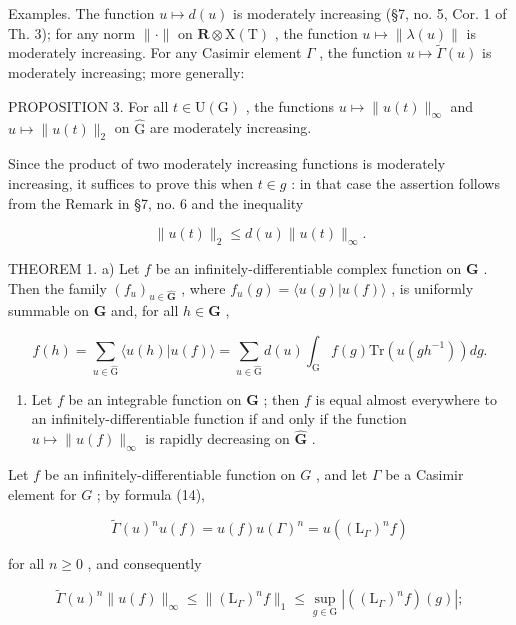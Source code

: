 Examples. The function \(u \mapsto d(u)\) is moderately increasing (§7, no. 5, Cor. 1 of Th. 3); for any norm \(\| \cdot \|\) on \(\mathbf{R} \otimes \mathrm{X(T)}\) , the function \(u \mapsto \| \lambda(u) \|\) is moderately increasing. For any Casimir element \(\Gamma\) , the function \(u \mapsto \tilde{\Gamma}(u)\) is moderately increasing; more generally:

PROPOSITION 3. For all \(t \in \mathrm{U}(\mathrm{G})\) , the functions \(u \mapsto \| u(t) \|_{\infty}\) and \(u \mapsto \| u(t) \|_2\) on \(\hat{\mathrm{G}}\) are moderately increasing.

Since the product of two moderately increasing functions is moderately increasing, it suffices to prove this when \(t \in g\) : in that case the assertion follows from the Remark in §7, no. 6 and the inequality

\[
\| u (t) \| _ {2} \leq d (u) \| u (t) \| _ {\infty}.
\]

THEOREM 1. a) Let \(f\) be an infinitely-differentiable complex function on \(\mathbf{G}\) . Then the family \((f_u)_{u\in \hat{\mathbf{G}}}\) , where \(f_{u}(g) = \langle u(g)|u(f)\rangle\) , is uniformly summable on \(\mathbf{G}\) and, for all \(h\in \mathbf{G}\) ,

\[
f (h) = \sum_ {u \in \hat {\mathrm{G}}} \langle u (h) | u (f) \rangle = \sum_ {u \in \hat {\mathrm{G}}} d (u) \int_ {\mathrm{G}} f (g) \mathrm{Tr} (u (g h ^ {- 1}))   d g.
\]

\begin{enumerate}
\def\labelenumi{\alph{enumi})}
\setcounter{enumi}{1}
\tightlist
\item
  Let \(f\) be an integrable function on \(\mathbf{G}\) ; then \(f\) is equal almost everywhere to an infinitely-differentiable function if and only if the function \(u \mapsto \| u(f) \|_{\infty}\) is rapidly decreasing on \(\hat{\mathbf{G}}\) .
\end{enumerate}

Let \(f\) be an infinitely-differentiable function on \(G\) , and let \(\Gamma\) be a Casimir element for \(G\) ; by formula (14),

\[
\tilde {\Gamma} (u) ^ {n} u (f) = u (f) u (\Gamma) ^ {n} = u ((\mathrm{L} _ {\Gamma}) ^ {n} f)
\]

for all \(n \geq 0\) , and consequently

\[
\tilde {\Gamma} (u) ^ {n} \| u (f) \| _ {\infty} \leq \| (\mathrm{L} _ {\Gamma}) ^ {n} f \| _ {1} \leq \sup _ {g \in \mathrm{G}} | ((\mathrm{L} _ {\Gamma}) ^ {n} f) (g) |;\tag{15}
\]

